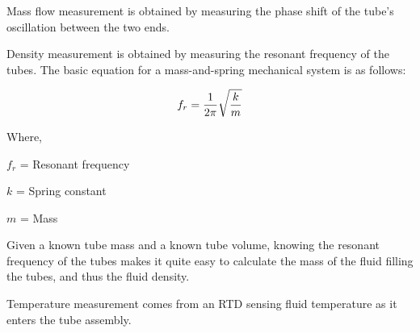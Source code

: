 \vskip 10pt

Mass flow measurement is obtained by measuring the phase shift of the tube's oscillation between the two ends.  

Density measurement is obtained by measuring the resonant frequency of the tubes.  The basic equation for a mass-and-spring mechanical system is as follows:

$$f_r = {1 \over 2 \pi} \sqrt{k \over m}$$

\noindent
Where,

$f_r$ = Resonant frequency

$k$ = Spring constant

$m$ = Mass 

\vskip 10pt

Given a known tube mass and a known tube volume, knowing the resonant frequency of the tubes makes it quite easy to calculate the mass of the fluid filling the tubes, and thus the fluid density.  

Temperature measurement comes from an RTD sensing fluid temperature as it enters the tube assembly.  











